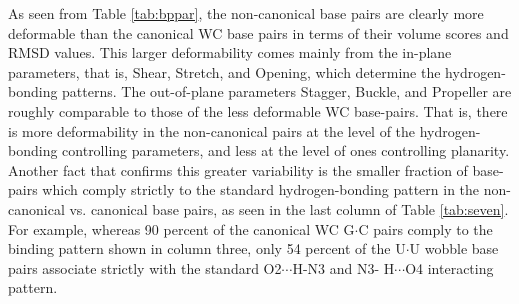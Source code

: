 As seen  from Table \ref{tab:bppar}, the non-canonical  base pairs are
clearly more deformable  than the canonical WC base  pairs in terms of
their volume  scores and RMSD values. This  larger deformability comes
mainly  from the  in-plane parameters,  that is,  Shear,  Stretch, and
Opening,   which  determine   the   hydrogen-bonding  patterns.    The
out-of-plane  parameters Stagger,  Buckle, and  Propeller  are roughly
comparable to  those of the  less deformable WC base-pairs.   That is,
there is more deformability in the non-canonical pairs at the level of
the hydrogen-bonding controlling parameters,  and less at the level of
ones controlling  planarity. Another  fact that confirms  this greater
variability  is  the  smaller  fraction  of  base-pairs  which  comply
strictly to the standard hydrogen-bonding pattern in the non-canonical
vs.   canonical  base pairs,  as  seen in  the  last  column of  Table
\ref{tab:seven}. For  example, whereas 90 percent of  the canonical WC
G$\cdot$C pairs comply to the binding pattern shown in column three,
only 54 percent of the  U$\cdot$U wobble base pairs associate strictly
with  the  standard  O2$\cdots$H-N3  and N3-  H$\cdots$O4  interacting
pattern.

